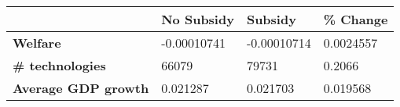 \begin{tabular}{|l|l|l|l|}
\hline
&\textbf{No Subsidy}&\textbf{Subsidy}&\textbf{\% Change}\\\hline
\textbf{Welfare}&-0.00010741&-0.00010714&0.0024557\\\hline
\textbf{\# technologies}&66079&79731&0.2066\\\hline
\textbf{Average GDP growth}&0.021287&0.021703&0.019568\\\hline
\end{tabular}
